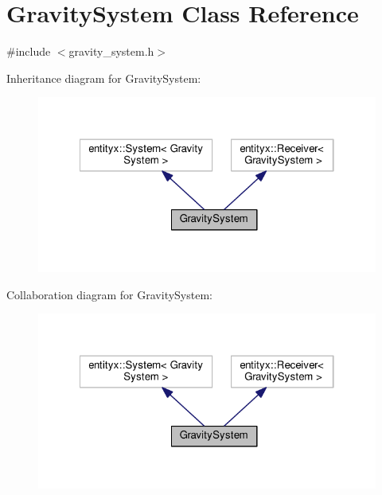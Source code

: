 \hypertarget{classGravitySystem}{}\section{Gravity\+System Class Reference}
\label{classGravitySystem}


{\ttfamily \#include $<$gravity\+\_\+system.\+h$>$}



Inheritance diagram for Gravity\+System\+:
\nopagebreak
\begin{figure}[H]
\begin{center}
\leavevmode
\includegraphics[width=322pt]{classGravitySystem__inherit__graph}
\end{center}
\end{figure}


Collaboration diagram for Gravity\+System\+:
\nopagebreak
\begin{figure}[H]
\begin{center}
\leavevmode
\includegraphics[width=322pt]{classGravitySystem__coll__graph}
\end{center}
\end{figure}
